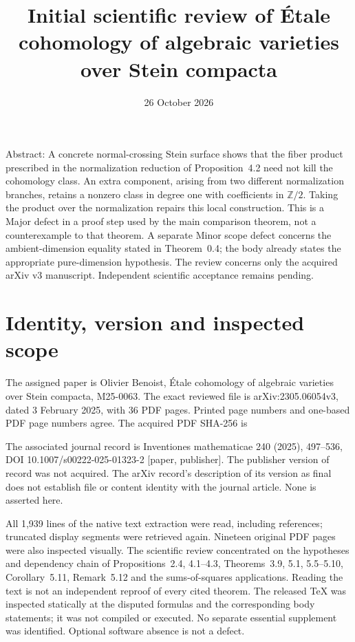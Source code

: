\documentclass[10pt]{article}
\title{Initial scientific review of
Étale cohomology of algebraic varieties over Stein compacta}
\author{}
\date{26 October 2026}
\begin{document}
\maketitle
Abstract: A concrete normal-crossing Stein surface shows that the fiber product prescribed in the normalization reduction of Proposition 4.2 need not kill the cohomology class. An extra component, arising from two different normalization branches, retains a nonzero class in degree one with coefficients in \(\mathbb Z/2\). Taking the product over the normalization repairs this local construction. This is a Major defect in a proof step used by the main comparison theorem, not a counterexample to that theorem. A separate Minor scope defect concerns the ambient-dimension equality stated in Theorem 0.4; the body already states the appropriate pure-dimension hypothesis. The review concerns only the acquired arXiv v3 manuscript. Independent scientific acceptance remains pending.\par
\section*{Identity, version and inspected scope}
The assigned paper is Olivier Benoist, Étale cohomology of algebraic varieties over Stein compacta, M25-0063. The exact reviewed file is arXiv:2305.06054v3, dated 3 February 2025, with 36 PDF pages. Printed page numbers and one-based PDF page numbers agree. The acquired PDF SHA-256 is\par
The associated journal record is Inventiones mathematicae 240 (2025), 497–536, DOI 10.1007/s00222-025-01323-2 [paper, publisher]. The publisher version of record was not acquired. The arXiv record’s description of its version as final does not establish file or content identity with the journal article. None is asserted here.\par
All 1,939 lines of the native text extraction were read, including references; truncated display segments were retrieved again. Nineteen original PDF pages were also inspected visually. The scientific review concentrated on the hypotheses and dependency chain of Propositions 2.4, 4.1–4.3, Theorems 3.9, 5.1, 5.5–5.10, Corollary 5.11, Remark 5.12 and the sums-of-squares applications. Reading the text is not an independent reproof of every cited theorem. The released TeX was inspected statically at the disputed formulas and the corresponding body statements; it was not compiled or executed. No separate essential supplement was identified. Optional software absence is not a defect.\par
\end{document}

